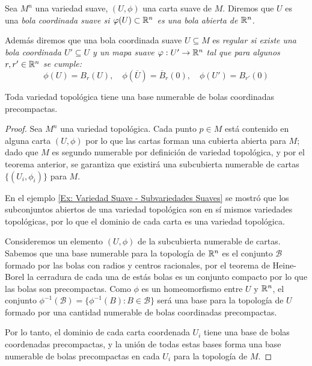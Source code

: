 \begin{definition}\label{Definición: Bolas Coordinadas Suaves}
  Sea $M^n$ una variedad suave, $(U,\phi)$ una carta suave de $M$. Diremos que $U$ es una \it{bola coordinada suave} si $\varphi(U) \subset \mathbb{R}^n$ es una bola abierta de $\mathbb{R}^n$.
  
  Además diremos que una bola coordinada suave $U \subseteq M$ es \it{regular} si existe una bola coordinada $U' \subseteq U$ y un mapa suave $\varphi: U' \to \mathbb{R}^n$ tal que para algunos $r, r' \in \mathbb{R}^n$ se cumple:
  \[
    \phi(U) = B_r(U), \quad \phi(\overline{U}) = \overline{B}_r(0), \quad \phi(U') = B_{r'}(0)
  \] 
\end{definition}

\begin{lemma}\label{Lemma: Bolas Precompactas}
  Toda variedad topológica tiene una base numerable de bolas coordinadas precompactas.
\end{lemma}

\begin{proof}
  Sea $M^n$ una variedad topológica. Cada punto $p \in M$ está contenido en alguna carta $(U,\phi)$ por lo que las cartas forman una cubierta abierta para $M$; dado que $M$ es segundo numerable por definición de variedad topológica, y por el teorema anterior, se garantiza que existirá una subcubierta numerable de cartas $\{(U_i,\phi_i)\}$ para $M$.

  En el ejemplo \ref{Ex: Variedad Suave - Subvariedades Suaves} se mostró que los subconjuntos abiertos de una variedad topológica son en sí mismos variedades topológicas, por lo que el dominio de cada carta es una variedad topológica.

  Consideremos un elemento $(U,\phi)$ de la subcubierta numerable de cartas. Sabemos que una base numerable para la topología de $\mathbb{R}^n$ es el conjunto $\mathcal{B}$ formado por las bolas con radios y centros racionales, por el teorema de Heine-Borel la cerradura de cada una de estás bolas es un conjunto compacto por lo que las bolas son precompactas. Como $\phi$ es un homeomorfismo entre $U$ y $\mathbb{R}^n$, el conjunto $\phi^{-1} (\mathcal{B})= \{\phi^{-1}(B): B \in \mathcal{B}\}$ será una base para la topología de $U$ formado por una cantidad numerable de bolas coordinadas precompactas.

  Por lo tanto, el dominio de cada carta coordenada $U_i$ tiene una base de bolas coordenadas precompactas, y la unión de todas estas bases forma una base numerable de bolas precompactas en cada $U_i$ para la topología de $M$.
\end{proof}


